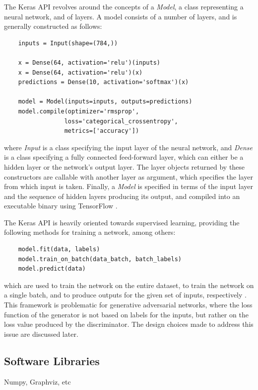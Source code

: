 \documentclass[12pt, titlepage]{report}
\theoremstyle{definition}
\begin{document}
The Keras API revolves around the concepts of a \textit{Model}, a class representing a neural network, and of layers. A model consists of a number of layers, and is generally constructed as follows:

\begin{verbatim}
	inputs = Input(shape=(784,))

	x = Dense(64, activation='relu')(inputs)
	x = Dense(64, activation='relu')(x)
	predictions = Dense(10, activation='softmax')(x)

	model = Model(inputs=inputs, outputs=predictions)
	model.compile(optimizer='rmsprop',
             	 loss='categorical_crossentropy',
              	 metrics=['accuracy'])
\end{verbatim}

where \textit{Input} is a class specifying the input layer of the neural network, and \textit{Dense} is a class specifying a fully connected feed-forward layer, which can either be a hidden layer or the network's output layer. The layer objects returned by these constructors are callable with another layer as argument, which specifies the layer from which input is taken. Finally, a \textit{Model} is specified in terms of the input layer and the sequence of hidden layers producing its output, and compiled into an executable binary using TensorFlow \cite{keras}.

The Keras API is heavily oriented towards supervised learning, providing the following methods for training a network, among others:

\begin{verbatim}
    model.fit(data, labels)
    model.train_on_batch(data_batch, batch_labels)
    model.predict(data)
\end{verbatim}

which are used to train the network on the entire dataset, to train the network on a single batch, and to produce outputs for the given set of inputs, respectively \cite{keras}. This framework is problematic for generative adversarial networks, where the loss function of the generator is not based on labels for the inputs, but rather on the loss value produced by the discriminator. The design choices made to address this issue are discussed later.

\subsection{Software Libraries}
Numpy, Graphviz, etc
\end{document}
